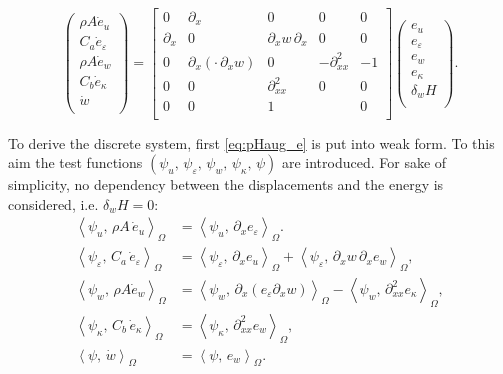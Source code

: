 \documentclass{ifacconf}
\newcommand{\inner}[3][]{\ensuremath{\left\langle #2, \, #3 \right\rangle_{#1}}}
\begin{document}
\begin{equation}\label{eq:pHaug_e}
	\begin{pmatrix}
		\rho A \dot{e}_u \\
		C_a \dot{e}_\varepsilon \\
		\rho A \dot{e}_w \\
		C_b \dot{e}_\kappa \\
		\dot{w} \\
	\end{pmatrix} = 
	\begin{bmatrix}
		0 & \partial_x & 0 & 0 & 0\\
		\partial_x & 0 & \partial_x w \, \partial_x & 0 & 0 \\
		0 & \partial_x(\cdot \, \partial_x w) & 0 & -\partial_{xx}^2 & -1 \\
		0 & 0 & \partial_{xx}^2 & 0 & 0 \\ 
		0 & 0 & 1 &  & 0 \\
	\end{bmatrix}
	\begin{pmatrix}
		e_u \\
		e_\varepsilon \\
		e_w \\
		e_\kappa \\
		\delta_w H \\
	\end{pmatrix}.
\end{equation}

To derive the discrete system, first \eqref{eq:pHaug_e} is put into weak form. To this aim the test functions $(\psi_u,\, \psi_\varepsilon,\, \psi_w,\, \psi_\kappa,\, \psi)$ are introduced. For sake of simplicity, no dependency between the displacements and the energy is considered, i.e. $\delta_w H=0$:
\begin{equation}
	\begin{aligned}
	\inner[\Omega]{\psi_u}{\rho A \, \dot{e}_u} &= \inner[\Omega]{\psi_u}{\partial_x e_\varepsilon}. \\
	\inner[\Omega]{\psi_\varepsilon}{C_a \, \dot{e}_\varepsilon} &= \inner[\Omega]{\psi_\varepsilon}{\partial_x e_u} + \inner[\Omega]{\psi_\varepsilon}{\partial_x w \, \partial_x e_w}, \\
	\inner[\Omega]{\psi_w}{\rho A\dot{e}_w} &= \inner[\Omega]{\psi_w}{\partial_x(e_\varepsilon \partial_x w)} - \inner[\Omega]{\psi_w}{\partial^2_{xx} e_\kappa}, \\
	\inner[\Omega]{\psi_\kappa}{C_b \, \dot{e}_\kappa} &= \inner[\Omega]{\psi_\kappa}{\partial^2_{xx} e_w}, \\
	\inner[\Omega]{\psi}{\dot{w}} &= \inner[\Omega]{\psi}{e_w}. \\
	\end{aligned}
\end{equation}
\end{document}
